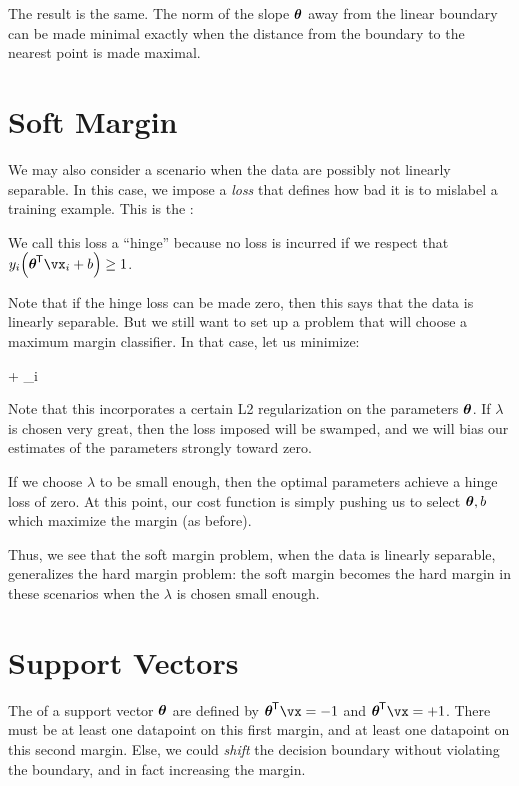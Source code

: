 \documentclass[11pt, oneside]{amsart}
\begin{document}
The result is the same. The norm of the slope $\bm{\mathrm{\theta}}$ away from the
linear boundary can be made minimal exactly when the distance from the
boundary to the nearest point is made maximal.


\section{Soft Margin}

We may also consider a scenario when the data are possibly not linearly
separable. In this case, we impose a \emph{loss} that defines how bad it
is to mislabel a training example. This is the :

\begin{nedqn}
\end{nedqn}

We call this loss a ``hinge'' because no loss is incurred if we respect
that $y_i \parens{\vtheta\tran \vx_i + b} \geq 1$.

Note that if the hinge loss can be made zero, then this says that the
data is linearly separable. But we still want to set up a problem that
will choose a maximum margin classifier. In that case, let us minimize:

\begin{nedqn}
  \lambda \normsq{\vtheta} + \sum_i 
\end{nedqn}

\noindent
Note that this incorporates a certain L2 regularization on the
parameters $\bm{\mathrm{\theta}}$. If $\lambda$ is chosen very great, then the loss
imposed will be swamped, and we will bias our estimates of the
parameters strongly toward zero.

If we choose $\lambda$ to be small enough, then the optimal parameters
achieve a hinge loss of zero. At this point, our cost function is simply
pushing us to select $\bm{\mathrm{\theta}}, b$ which maximize the margin (as before).

Thus, we see that the soft margin problem, when the data is linearly
separable, generalizes the hard margin problem: the soft margin becomes
the hard margin in these scenarios when the $\lambda$ is chosen small
enough.

\section{Support Vectors}

The  of a support vector $\bm{\mathrm{\theta}}$ are defined by
$\vtheta\tran \vx = -1$ and $\vtheta\tran \vx = +1$. There must be at
least one datapoint on this first margin, and at least one datapoint on
this second margin. Else, we could \emph{shift} the decision boundary
without violating the boundary, and in fact increasing the margin.
\end{document}
